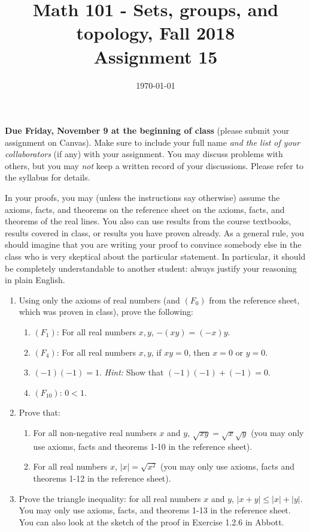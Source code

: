 \documentclass{amsart}
\title[Math 101, Fall 2018: assignment 15]{Math 101 - Sets, groups, and topology, Fall 2018 \\ Assignment 15}
\date{\today}
\theoremstyle{definition}
\begin{document}

\maketitle

\textbf{Due Friday, November 9 at the beginning of class} (please submit your assignment on Canvas). Make sure to include your full name \emph{and the list of your collaborators} (if any) with your assignment. You may discuss problems with others, but you may \emph{not} keep a written record of your discussions. Please refer to the syllabus for details.

In your proofs, you may (unless the instructions say otherwise) assume the axioms, facts, and theorems on the reference sheet on the axioms, facts, and theorems of the real lines. You also can use results from the course textbooks, results covered in class, or results you have proven already. As a general rule, you should imagine that you are writing your proof to convince somebody else in the class who is very skeptical about the particular statement. In particular, it should be completely understandable to another student: always justify your reasoning in plain English. 

\begin{enumerate}
  \item Using only the axioms of real numbers (and $(F_0)$ from the reference sheet, which was proven in class), prove the following:

  \begin{enumerate}
  \item $(F_1)$: For all real numbers $x, y$, $-(xy) = (-x)y$.
  \item $(F_4)$: For all real numbers $x, y$, if $x y = 0$, then $x = 0$ or $y = 0$.
  \item $(-1)(-1) = 1$. \emph{Hint:} Show that $(-1)(-1) + (-1) = 0$.
  \item $(F_{10})$: $0 < 1$.
  \end{enumerate}

\item Prove that:

  \begin{enumerate}
  \item For all non-negative real numbers $x$ and $y$, $\sqrt{xy} = \sqrt{x}\sqrt{y}$ (you may only use axioms, facts and theorems 1-10 in the reference sheet).
  \item For all real numbers $x$, $|x| = \sqrt{x^2}$ (you may only use axioms, facts and theorems 1-12 in the reference sheet).
  \end{enumerate}

\item Prove the triangle inequality: for all real numbers $x$ and $y$, $|x + y| \le |x| + |y|$. You may only use axioms, facts, and theorems 1-13 in the reference sheet. You can also look at the sketch of the proof in Exercise 1.2.6 in Abbott.
\end{enumerate}



\end{document}
